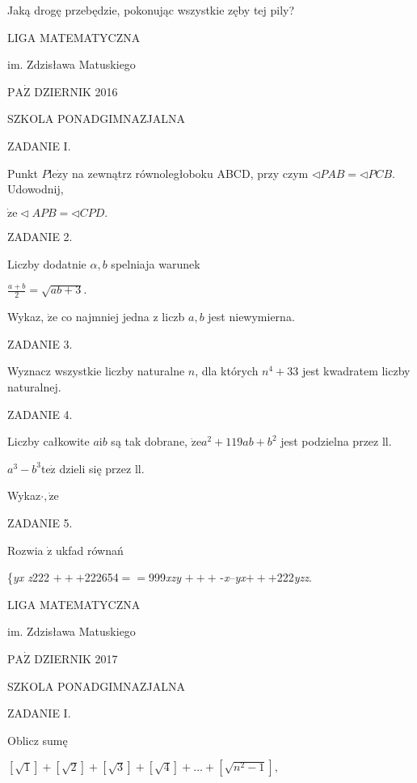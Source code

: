 \documentclass[a4paper,12pt]{article}
\begin{document}
Jaką drogę przebędzie, pokonując wszystkie zęby tej pily?






LIGA MATEMATYCZNA

im. Zdzisława Matuskiego

$\mathrm{P}\mathrm{A}\dot{\mathrm{Z}}$ DZIERNIK 2016

SZKOLA PONADGIMNAZJALNA

ZADANIE I.

Punkt $P\mathrm{l}\mathrm{e}\dot{\mathrm{z}}\mathrm{y}$ na zewnątrz równoległoboku ABCD, przy czym $\triangleleft PAB=\triangleleft PCB$. Udowodnij,

$\dot{\mathrm{z}}\mathrm{e}\triangleleft APB=\triangleleft CPD.$

ZADANIE 2.

Liczby dodatnie $\alpha, b$ spelniaja warunek

$\displaystyle \frac{a+b}{2}=\sqrt{ab+3}.$

Wykaz, $\dot{\mathrm{z}}\mathrm{e}$ co najmniej jedna z liczb $a, b$ jest niewymierna.

ZADANIE 3.

Wyznacz wszystkie liczby naturalne $n$, dla których $n^{4}+33$ jest kwadratem liczby naturalnej.

ZADANIE 4.

Liczby całkowite $a\mathrm{i}b$ są tak dobrane, $\dot{\mathrm{z}}\mathrm{e}a^{2}+119ab+b^{2}$ jest podzielna przez ll.

$a^{3}-b^{3}\mathrm{t}\mathrm{e}\dot{\mathrm{z}}$ dzieli się przez ll.

Wykaz$\cdot, \dot{\mathrm{z}}\mathrm{e}$

ZADANIE 5.

Rozwia $\dot{\mathrm{z}}$ ukfad równań

\{{\it yx  z}222 $+++$222654$==$999{\it xzy} $+++$ -{\it x}--{\it yx}$+++$222{\it yzz}.






LIGA MATEMATYCZNA

im. Zdzisława Matuskiego

$\mathrm{P}\mathrm{A}\dot{\mathrm{Z}}$ DZIERNIK 2017

SZKOLA PONADGIMNAZJALNA

ZADANIE I.

Oblicz sumę

$[\sqrt{1}]+[\sqrt{2}]+[\sqrt{3}]+[\sqrt{4}]+\ldots+[\sqrt{n^{2}-1}],$
\end{document}
